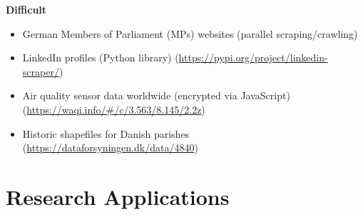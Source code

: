 \documentclass[12pt]{article}
\begin{document}
\textbf{Difficult}
\begin{itemize}
    \item German Members of Parliament (MPs) websites (parallel scraping/crawling)
    \item LinkedIn profiles (Python library) (\url{https://pypi.org/project/linkedin-scraper/})
    \item Air quality sensor data worldwide (encrypted via JavaScript) (\url{https://waqi.info/#/c/3.563/8.145/2.2z})
    \item Historic shapefiles for Danish parishes (\url{https://dataforsyningen.dk/data/4840})
\end{itemize}


\section*{Research Applications}
\end{document}
